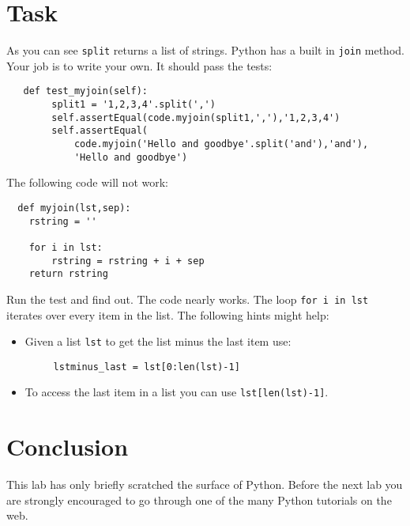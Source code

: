 \documentclass{paper}
\begin{document}
\section{Task}
As you can see {\tt split} returns a list of strings. Python has a built
in {\tt join} method. Your job is to write your own. It should pass the
tests:
\begin{lstlisting}
   def test_myjoin(self):
        split1 = '1,2,3,4'.split(',')
        self.assertEqual(code.myjoin(split1,','),'1,2,3,4')
        self.assertEqual(
            code.myjoin('Hello and goodbye'.split('and'),'and'),
            'Hello and goodbye')
\end{lstlisting}

The following code will not work:
\begin{lstlisting}
  def myjoin(lst,sep):
    rstring = ''
    
    for i in lst:
        rstring = rstring + i + sep
    return rstring
\end{lstlisting}
Run the test and find out. The code nearly works. The loop {\tt for i
  in lst} iterates over every item in the list. The following hints might help:
\begin{itemize}
\item Given a list {\tt lst} to get the list minus the last item use:
  \begin{lstlisting}
     lstminus_last = lst[0:len(lst)-1]
  \end{lstlisting}
\item To access the last item in a list you can use {\tt lst[len(lst)-1]}.
\end{itemize}


\section*{Conclusion}
This lab has only briefly scratched the surface of Python. Before the
next lab you are strongly encouraged to go through one of  the many
Python tutorials on the web. 
\end{document}
